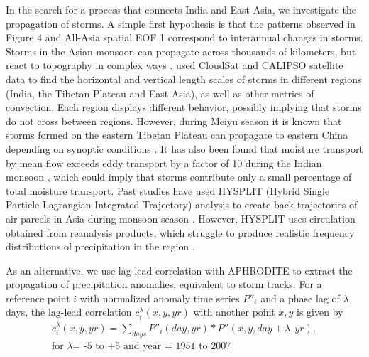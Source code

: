 \documentclass[12pt]{article}
\begin{document}
	In the search for a process that connects India and East Asia, we investigate the propagation of storms. A simple first hypothesis is that the patterns observed in Figure 4 and All-Asia spatial EOF 1 correspond to interannual changes in storms. Storms in the Asian monsoon can propagate across thousands of kilometers, but react to topography in complex ways \citep{Romatschke2011a}. \cite{Luo2011} used CloudSat and CALIPSO satellite data to find the horizontal and vertical length scales of storms in different regions (India, the Tibetan Plateau and East Asia), as well as other metrics of convection. Each region displays different behavior, possibly implying that storms do not cross between regions. However, during Meiyu season it is known that storms formed on the eastern Tibetan Plateau can propagate to eastern China depending on synoptic conditions \citep{Xu2011,Wang2012a}. It has also been found that moisture transport by mean flow exceeds eddy transport by a factor of 10 during the Indian monsoon \citep{Feng2012}, which could imply that storms contribute only a small percentage of total moisture transport. Past studies have used HYSPLIT (Hybrid Single Particle Lagrangian Integrated Trajectory) analysis to create back-trajectories of air parcels in Asia during monsoon season \citep{Medina2010,Cai2012,Gao2013}. However, HYSPLIT uses circulation obtained from reanalysis products, which struggle to produce realistic frequency distributions of precipitation in the region \citep{Pena-Arancibia2013}. 
	
	As an alternative, we use lag-lead correlation with APHRODITE to extract the propagation of precipitation anomalies, equivalent to storm tracks.  For a reference point $i$ with normalized anomaly time series $P''_i$ and a phase lag of $\lambda$ days, the lag-lead correlation $c_i^\lambda(x,y,yr)$ with another point $x,y$ is given by
\begin{gather*}
	c_i^\lambda(x,y,yr)=\sum_{days}P''_i(day,yr)*P''(x,y,day+\lambda,yr),\\
	\text{for } \lambda \text{= -5 to +5 and year = 1951 to 2007}
\end{gather*}
	
\end{document}

